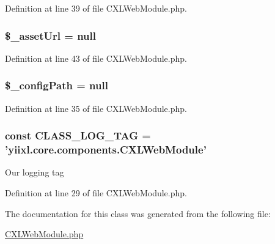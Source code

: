Definition at line 39 of file CXLWebModule.php.

\hypertarget{classCXLWebModule_a181134a3a040d43e6913ad39fa94ee66}{
\subsubsection[{\$\_\-assetUrl}]{\setlength{\rightskip}{0pt plus 5cm}\$\_\-assetUrl = null}}
\label{classCXLWebModule_a181134a3a040d43e6913ad39fa94ee66}


Definition at line 43 of file CXLWebModule.php.

\hypertarget{classCXLWebModule_a05a571c47e275207658ec3ff2a228291}{
\subsubsection[{\$\_\-configPath}]{\setlength{\rightskip}{0pt plus 5cm}\$\_\-configPath = null}}
\label{classCXLWebModule_a05a571c47e275207658ec3ff2a228291}


Definition at line 35 of file CXLWebModule.php.

\hypertarget{classCXLWebModule_aa607ab5e557e6ebb60b85c5a20ad067f}{
\subsubsection[{CLASS\_\-LOG\_\-TAG}]{\setlength{\rightskip}{0pt plus 5cm}const {\bf CLASS\_\-LOG\_\-TAG} = 'yiixl.core.components.CXLWebModule'}}
\label{classCXLWebModule_aa607ab5e557e6ebb60b85c5a20ad067f}
Our logging tag 

Definition at line 29 of file CXLWebModule.php.



The documentation for this class was generated from the following file:\begin{DoxyCompactItemize}
\item 
\hyperlink{CXLWebModule_8php}{CXLWebModule.php}\end{DoxyCompactItemize}
